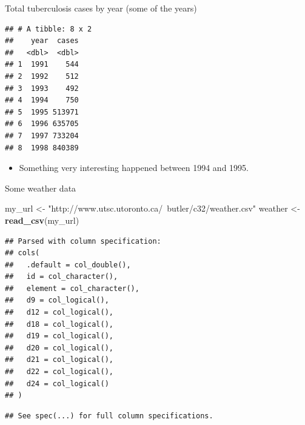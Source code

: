 \documentclass[ignorenonframetext,]{beamer}
\newenvironment{Shaded}{\begin{snugshade}}{\end{snugshade}}
\newcommand{\DataTypeTok}[1]{\textcolor[rgb]{0.13,0.29,0.53}{#1}}
\newcommand{\DecValTok}[1]{\textcolor[rgb]{0.00,0.00,0.81}{#1}}
\newcommand{\KeywordTok}[1]{\textcolor[rgb]{0.13,0.29,0.53}{\textbf{#1}}}
\newcommand{\NormalTok}[1]{#1}
\newcommand{\OperatorTok}[1]{\textcolor[rgb]{0.81,0.36,0.00}{\textbf{#1}}}
\newcommand{\StringTok}[1]{\textcolor[rgb]{0.31,0.60,0.02}{#1}}
\providecommand{\tightlist}{%
  \setlength{\itemsep}{0pt}\setlength{\parskip}{0pt}}
\begin{document}
\begin{frame}[fragile]{Total tuberculosis cases by year (some of the
years)}
\protect\hypertarget{total-tuberculosis-cases-by-year-some-of-the-years}{}

\begin{Shaded}
\end{Shaded}

\begin{verbatim}
## # A tibble: 8 x 2
##    year  cases
##   <dbl>  <dbl>
## 1  1991    544
## 2  1992    512
## 3  1993    492
## 4  1994    750
## 5  1995 513971
## 6  1996 635705
## 7  1997 733204
## 8  1998 840389
\end{verbatim}

\begin{itemize}
\tightlist
\item
  Something very interesting happened between 1994 and 1995.
\end{itemize}

\end{frame}

\begin{frame}[fragile]{Some weather data}
\protect\hypertarget{some-weather-data}{}

\begin{Shaded}
\begin{Highlighting}[]
\NormalTok{my_url <-}\StringTok{ "http://www.utsc.utoronto.ca/~butler/c32/weather.csv"}
\NormalTok{weather <-}\StringTok{ }\KeywordTok{read_csv}\NormalTok{(my_url)}
\end{Highlighting}
\end{Shaded}

\begin{verbatim}
## Parsed with column specification:
## cols(
##   .default = col_double(),
##   id = col_character(),
##   element = col_character(),
##   d9 = col_logical(),
##   d12 = col_logical(),
##   d18 = col_logical(),
##   d19 = col_logical(),
##   d20 = col_logical(),
##   d21 = col_logical(),
##   d22 = col_logical(),
##   d24 = col_logical()
## )
\end{verbatim}

\begin{verbatim}
## See spec(...) for full column specifications.
\end{verbatim}

\end{frame}
\end{document}
